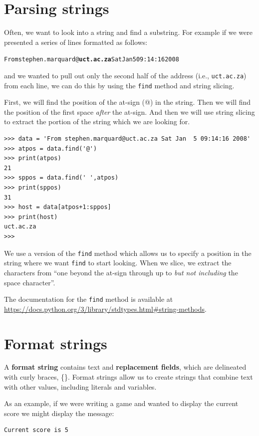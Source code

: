 \section{Parsing strings}

Often, we want to look into a string and find a substring.  For example
if we were presented a series of lines formatted as follows:

\beforeverb
\begin{alltt}
From stephen.marquard@{\bf uct.ac.za} Sat Jan  5 09:14:16 2008
\end{alltt}
\afterverb

and we wanted to pull out only the second half of the address (i.e.,
{\tt uct.ac.za}) from each line, we can do this by using the {\tt find}
method and string slicing.   

First, we will find the position of the at-sign (@) in the string.  Then we will
find the position of the first space \emph{after} the at-sign.  And then we
will use string slicing to extract the portion of the string which we 
are looking for.

\beforeverb
\begin{verbatim}
>>> data = 'From stephen.marquard@uct.ac.za Sat Jan  5 09:14:16 2008'
>>> atpos = data.find('@')
>>> print(atpos)
21
>>> sppos = data.find(' ',atpos)
>>> print(sppos)
31
>>> host = data[atpos+1:sppos]
>>> print(host)
uct.ac.za
>>> 
\end{verbatim}
\afterverb
%
We use a version of the {\tt find} method which allows us to specify
a position in the string where we want {\tt find} to start looking.
When we slice, we extract the characters 
from ``one beyond the at-sign through up to \emph{but not including} the 
space character''.  

The documentation for the {\tt find} method is available at
\url{https://docs.python.org/3/library/stdtypes.html#string-methods}.

\section{Format strings}	


A {\bf format string} contains text and {\bf replacement fields}, which are delineated with curly braces, \{\}. Format strings allow us to create strings that combine text with other values, including literals and variables.

As an example, if we were writing a game and wanted to display the current score we might display the message:
\beforeverb
\begin{verbatim}
Current score is 5
\end{verbatim}
\afterverb

